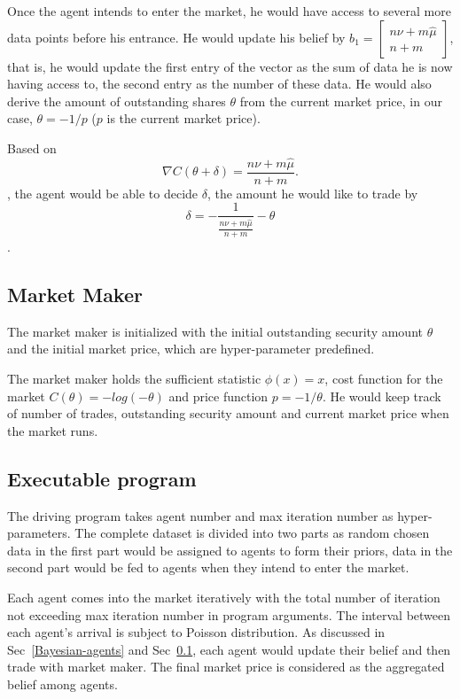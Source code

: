 \documentclass[12pt]{article}
\begin{document}
Once the agent intends to enter the market, he would have access to several more data points before his entrance. He would update his belief by %
$b_1=\begin{bmatrix}n\nu+m\hat{\mu} \\n+m\end{bmatrix}$, that is, he would update the first entry of the vector as the sum of data he is now having access to, the second entry as the number of these data. He would also derive the amount of outstanding shares $\theta$ from the current market price, in our case, $\theta = -1/p$ ($p$ is the current market price).

Based on %
$$\nabla C(\theta+\delta)=\dfrac{n\nu+m\hat{\mu}}{n+m}.$$, the agent would be able to decide $\delta$, the amount he would like to trade by 
$$
\delta=-\frac{1}{\frac{n\nu + m\hat{\mu}}{n + m}}-\theta
$$. 

\subsection{Market Maker}\label{market-maker}
The market maker is initialized with the initial outstanding security amount $\theta$ and the initial market price, which are hyper-parameter predefined.

The market maker holds the sufficient statistic $\phi(x) = x$, cost function for the market $C(\theta) = - log (- \theta)$ and price function $p = - 1 / \theta$. He would keep track of number of trades, outstanding security amount and current market price when the market runs.

\subsection{Executable program}\label{main-executable}
The driving program takes agent number and max iteration number as hyper-parameters. The complete dataset is divided into two parts as random chosen data in the first part would be assigned to agents to form their priors, data in the second part would be fed to agents when they intend to enter the market.

Each agent comes into the market iteratively with the total number of iteration not exceeding max iteration number in program arguments. The interval between each agent's arrival is subject to Poisson distribution.  %
As discussed in Sec~\ref{Bayesian-agents} and Sec~\ref{market-maker}, each agent would update their belief and then trade with market maker. The final market price is considered as the aggregated belief among agents.
\end{document}

